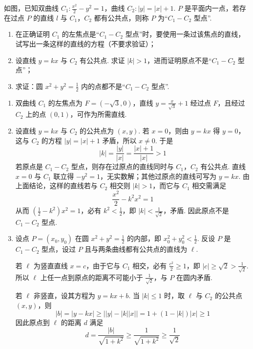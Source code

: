 \begin{problem}
如图，已知双曲线 \(C_1: \frac{x^2}{2} - y^2 = 1\)，曲线 \(C_2: |y| = |x| + 1\). \(P\) 是平面内一点，若存在过点 \(P\) 的直线 \(l\) 与 \(C_1\)，\(C_2\) 都有公共点，则称 \(P\) 为“\(C_1 - C_2\) 型点”.

\begin{enumerate}
\item 在正确证明 \(C_1\) 的左焦点是“\(C_1 - C_2\) 型点”时，要使用一条过该焦点的直线，试写出一条这样的直线的方程（不要求验证）；
\item 设直线 \(y = kx\) 与 \(C_2\) 有公共点. 求证 \(|k| > 1\)，进而证明原点不是“\(C_1 - C_2\) 型点”；
\item 求证：圆 \(x^2 + y^2 = \frac{1}{2}\) 内的点都不是“\(C_1 - C_2\) 型点”.
\end{enumerate}


\begin{solution}
\begin{enumerate}
\item 双曲线 \(C_1\) 的左焦点为 \(F=(-\sqrt{3},0)\)，直线 \(y=\frac{x}{\sqrt{3}}+1\) 经过点 \(F\)，且经过 \(C_2\) 上的点 \((0,1)\)，可作为所需直线.
\item 设直线 \(y=kx\) 与 \(C_2\) 的公共点为 \((x,y)\). 若 \(x=0\)，则由 \(y=kx\) 得 \(y=0\)，这与 \(C_2\) 的方程 \(|y|=|x|+1\) 矛盾，所以 \(x\neq0\). 于是
\[
|k|=\frac{|y|}{|x|}=\frac{|x|+1}{|x|}>1
\]
若原点是 \(C_1-C_2\) 型点，则存在过原点的直线同时与 \(C_1\)，\(C_2\) 有公共点. 直线 \(x=0\) 与 \(C_1\) 联立得 \(-y^2=1\)，无实数解；其他过原点的直线可写为 \(y=kx\). 由上面结论，这样的直线若与 \(C_2\) 相交则 \(|k|>1\)，而它与 \(C_1\) 相交需满足
\[
\frac{x^2}{2}-k^2x^2=1
\]
从而 \(\left(\frac{1}{2}-k^2\right)x^2=1\)，必有 \(k^2<\frac{1}{2}\)，即 \(|k|<\frac{1}{\sqrt{2}}\)，矛盾. 因此原点不是 \(C_1-C_2\) 型点.
\item 设点 \(P=(x_0,y_0)\) 在圆 \(x^2+y^2=\frac{1}{2}\) 的内部，即 \(x_0^2+y_0^2<\frac{1}{2}\). 反设 \(P\) 是 \(C_1-C_2\) 型点，设过 \(P\) 且与两条曲线都有公共点的直线为 \(\ell\).

若 \(\ell\) 为竖直直线 \(x=c\)，由于它与 \(C_1\) 相交，必有 \(\frac{c^2}{2}\geqslant1\)，即 \(|c|\geqslant\sqrt{2}>\frac{1}{\sqrt{2}}\). 所以 \(\ell\) 上任一点到原点的距离不可能小于 \(\frac{1}{\sqrt{2}}\)，与 \(P\) 在圆内矛盾.

若 \(\ell\) 非竖直，设其方程为 \(y=kx+b\). 当 \(|k|\leqslant1\) 时，取 \(\ell\) 与 \(C_2\) 的公共点 \((x,y)\)，则
\[
|b|=|y-kx|\geqslant\bigl||y|-|k||x|\bigr|=1+(1-|k|)|x|\geqslant1
\]
因此原点到 \(\ell\) 的距离 \(d\) 满足
\[
d=\frac{|b|}{\sqrt{1+k^2}}\geqslant\frac{1}{\sqrt{1+k^2}}\geqslant\frac{1}{\sqrt{2}}
\]


\end{enumerate}
\end{solution}
\end{problem}
